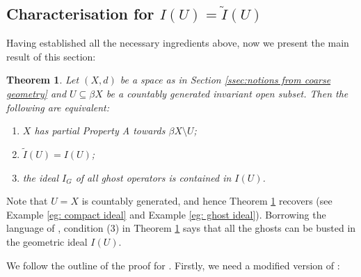 \documentclass[12pt, a4paper]{amsart}
\numberwithin{equation}{section}
\newtheorem{thm}{Theorem}[section]
\theoremstyle{definition}
\theoremstyle{remark}
\def\L{\mathcal{L}}
\def\L{{\bf L}}
\begin{document}
\subsection{Characterisation for $I(U) = \tilde{I}(U)$}\label{ssec:char for I(U)=tI(U)}


Having established all the necessary ingredients above, now we present the main result of this section:

\begin{thm}\label{thm:I(U)=tI(U)}
Let $(X,d)$ be a space as in Section \ref{ssec:notions from coarse geometry} and $U \subseteq \beta X$ be a countably generated invariant open subset.
Then the following are equivalent:
\begin{enumerate}
 \item $X$ has partial Property A towards $\beta X \setminus U$;
 \item $\tilde{I}(U) = I(U)$;
 \item the ideal $I_G$ of all ghost operators is contained in $I(U)$.
\end{enumerate}
\end{thm}

Note that $U=X$ is countably generated, and hence Theorem \ref{thm:I(U)=tI(U)} recovers \cite[Theorem 1.3]{RW14} (see Example \ref{eg: compact ideal} and Example \ref{eg: ghost ideal}). 
Borrowing the language of \cite{RW14}, condition (3) in Theorem \ref{thm:I(U)=tI(U)} says that all the ghosts can be busted in the geometric ideal $I(U)$.

We follow the outline of the proof for \cite[Theorem 1.3]{RW14}. Firstly, we need a modified version of \cite[Lemma 4.2]{RW14}:
\end{document}

